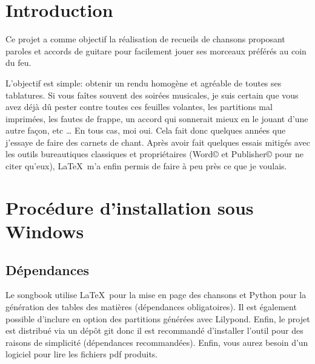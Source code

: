 \documentclass[versionenligne]{framabook}
\begin{document}

\thispagestyle{empty}
\tableofcontents \newpage

\section*{Introduction}

Ce projet a comme objectif la réalisation de recueils de chansons
proposant paroles et accords de guitare pour facilement jouer ses
morceaux préférés au coin du feu.

L'objectif est simple: obtenir un rendu homogène et agréable de toutes
ses tablatures. Si vous faîtes souvent des soirées musicales, je suis
certain que vous avez déjà dû pester contre toutes ces feuilles
volantes, les partitions mal imprimées, les fautes de frappe, un
accord qui sonnerait mieux en le jouant d'une autre façon, etc \dots
En tous cas, moi oui. Cela fait donc quelques années que j'essaye de
faire des carnets de chant. Après avoir fait quelques essais mitigés
avec les outils bureautiques classiques et propriétaires (Word© et
Publisher© pour ne citer qu'eux), \LaTeX\, m'a enfin permis de faire à
peu près ce que je voulais.

\section{Procédure d'installation sous Windows}

\subsection{Dépendances}\label{sec:songbook-dep-win}

Le songbook utilise \LaTeX\, pour la mise en page des chansons et Python
pour la génération des tables des matières (dépendances obligatoires).
Il est également possible d'inclure en option des partitions générées
avec Lilypond. Enfin, le projet est distribué via un dépôt git donc il
est recommandé d'installer l'outil pour des raisons de simplicité
(dépendances recommandées). Enfin, vous aurez besoin d'un logiciel
pour lire les fichiers pdf produits.
\end{document}
